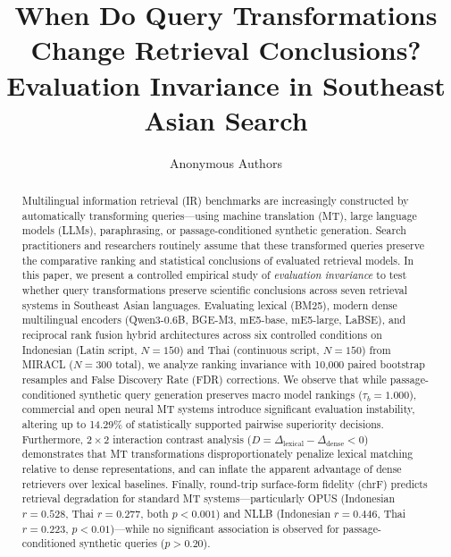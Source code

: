 \documentclass[runningheads]{llncs}
\begin{document}
\title{When Do Query Transformations Change Retrieval Conclusions? Evaluation Invariance in Southeast Asian Search}


\author{Anonymous Authors}

\maketitle

\begin{abstract}
Multilingual information retrieval (IR) benchmarks are increasingly constructed by automatically transforming queries---using machine translation (MT), large language models (LLMs), paraphrasing, or passage-conditioned synthetic generation. Search practitioners and researchers routinely assume that these transformed queries preserve the comparative ranking and statistical conclusions of evaluated retrieval models. In this paper, we present a controlled empirical study of \textit{evaluation invariance} to test whether query transformations preserve scientific conclusions across seven retrieval systems in Southeast Asian languages. Evaluating lexical (BM25), modern dense multilingual encoders (Qwen3-0.6B, BGE-M3, mE5-base, mE5-large, LaBSE), and reciprocal rank fusion hybrid architectures across six controlled conditions on Indonesian (Latin script, $N=150$) and Thai (continuous script, $N=150$) from MIRACL ($N=300$ total), we analyze ranking invariance with 10,000 paired bootstrap resamples and False Discovery Rate (FDR) corrections. We observe that while passage-conditioned synthetic query generation preserves macro model rankings ($\tau_b = 1.000$), commercial and open neural MT systems introduce significant evaluation instability, altering up to 14.29\% of statistically supported pairwise superiority decisions. Furthermore, $2 \times 2$ interaction contrast analysis ($D = \Delta_{\text{lexical}} - \Delta_{\text{dense}} < 0$) demonstrates that MT transformations disproportionately penalize lexical matching relative to dense representations, and can inflate the apparent advantage of dense retrievers over lexical baselines. Finally, round-trip surface-form fidelity (chrF) predicts retrieval degradation for standard MT systems---particularly OPUS (Indonesian $r = 0.528$, Thai $r = 0.277$, both $p < 0.001$) and NLLB (Indonesian $r = 0.446$, Thai $r = 0.223$, $p < 0.01$)---while no significant association is observed for passage-conditioned synthetic queries ($p > 0.20$).
\end{abstract}
\end{document}
